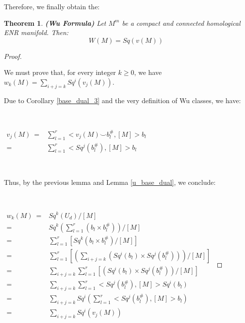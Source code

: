 \documentclass[12pt,oneside]{book}
\newtheorem{teo}    {Theorem}[chapter]
\newcommand{\ds}{\displaystyle}
\newcommand{\ccup}{\smile}
\begin{document}
    Therefore, we finally obtain the:

    \begin{teo}{\bf (Wu Formula)}
        Let $M^{m}$ be a compact and connected homological ENR manifold. Then:
    	$$ W(M)=Sq(v(M)) $$
    \end{teo}

    \begin{proof}

        \

        We must prove that, for every integer $k \geq 0$, we have $w_{k}(M)=\ds\sum_{i+j=k}Sq^{i}(v_{j}(M))$.

        Due to Corollary \ref{base_dual_3} and the very definition of Wu classes, we have:

        \

        $ \begin{array}{rl}
        	v_{j}(M) \ = & \ds\sum_{l=1}^{r}<v_{j}(M)\ccup b_{l}^{\#},[M]>b_{l} \\
        	= & \ds\sum_{l=1}^{r}<Sq^{j}(b_{l}^{\#}),[M]>b_{l}
        \end{array} $

        \

        Thus, by the previous lemma and Lemma \ref{u_base_dual}, we conclude:

        \

        $\begin{array}{rl}
        	w_{k}(M) \ = & Sq^{k}(U_{d})/[M] \\
        	= & Sq^{k}\left( \ds\sum_{l=1}^{r}(b_{l}\times b_{l}^{\#}) \right) / [M] \\
        	= & \ds\sum_{l=1}^{r} \left[ Sq^{k}(b_{l}\times b_{l}^{\#}) / [M] \right] \\
        	= & \ds\sum_{l=1}^{r} \left[ \left( \ds\sum_{i+j=k} \left( Sq^{i}(b_{l})\times Sq^{j}(b_{l}^{\#}) \right) \right) / [M] \right] \\
        	= & \ds\sum_{i+j=k}\ds\sum_{l=1}^{r} \left[ \left( Sq^{i}(b_{l})\times Sq^{j}(b_{l}^{\#}) \right) /[M] \right] \\
        	= & \ds\sum_{i+j=k}\ds\sum_{l=1}^{r}<Sq^{j}(b_{l}^{\#}),[M]>Sq^{i}(b_{l}) \\
        	= & \ds\sum_{i+j=k}Sq^{i}\left( \ds\sum_{l=1}^{r}<Sq^{j}(b_{l}^{\#}),[M]>b_{l} \right) \\
        	= & \ds\sum_{i+j=k}Sq^{i}(v_{j}(M))
        \end{array}$

    \end{proof}
\end{document}
